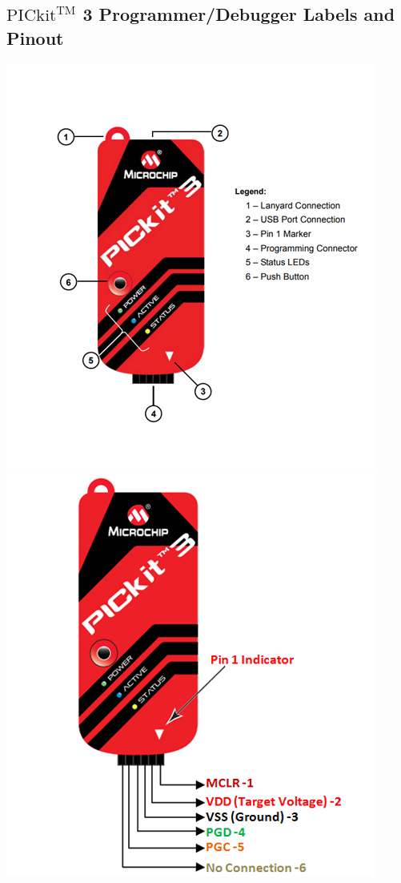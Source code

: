 \documentclass[12pt, letterpaper]{article}
\begin{document}
\subsection{$\text{PICkit}^{\text{TM}}$ 3 Programmer/Debugger Labels and Pinout}
\includegraphics[scale=0.5]{Images/PICKit3 Labels}
\includegraphics[scale=0.5]{Images/PICKit3 Pinout}
\end{document}
